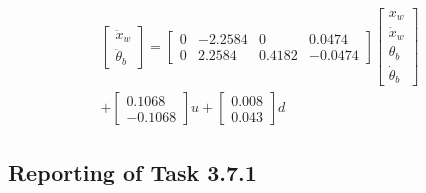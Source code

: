 \documentclass[11pt]{article} %
\begin{document}
\begin{enumerate}
\begin{equation*}
\begin{aligned}
\begin{bmatrix}
        \ddot{x}_w \\
        \ddot{\theta}_b
      \end{bmatrix}
      =
      \begin{bmatrix}
        0 & -2.2584 & 0 & 0.0474 \\
        0 & 2.2584 & 0.4182 & -0.0474
      \end{bmatrix}
      \begin{bmatrix}
        x_w\\
        \dot{x}_w\\
        \theta_b\\
        \dot{\theta}_b
      \end{bmatrix}
      \\
      +
      \begin{bmatrix}
        0.1068 \\
        -0.1068
      \end{bmatrix}
      u
      +
      \begin{bmatrix}
        0.008 \\
        0.043
      \end{bmatrix}
      d
    \end{aligned}
  \end{equation*}
\end{enumerate}
\subsection*{Reporting of Task 3.7.1}
\end{document}
